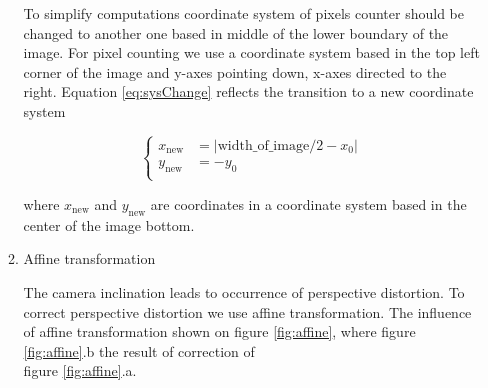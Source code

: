 \documentclass[a4paper,12pt]{article} %
\begin{document}
\begin{enumerate}
\begin{enumerate}
		To simplify computations coordinate system of pixels counter should be changed to another one based in middle of the lower boundary of the image. For pixel counting we use a coordinate system based in the top left corner of the image and y-axes pointing down, x-axes directed to the right. Equation \eqref{eq:sysChange} reflects the transition to a new coordinate system
	
		\begin{equation}
			\left\{
				\begin{aligned}
					x_{\text{new}} &= | \text{width\_of\_image} / 2 - x_0 | \\
					y_{\text{new}} &= -y_0\\
				\end{aligned}
			\right.
		\label{eq:sysChange}
		\end{equation}
	
	\begin{flushright}
		\footnotesize where $x_{\text{new}}$ and $y_{\text{new}}$ are coordinates in a coordinate system based in the center of the image bottom.
	\end{flushright}
	


	\newpage
		\item Affine transformation
		
		The camera inclination leads to occurrence of perspective distortion. To correct perspective distortion we use affine transformation. The influence of affine transformation shown on figure \ref{fig:affine}, where figure  \ref{fig:affine}.b the result of correction of \\figure \ref{fig:affine}.a.
		

\end{enumerate}
\end{enumerate}
\end{document}
